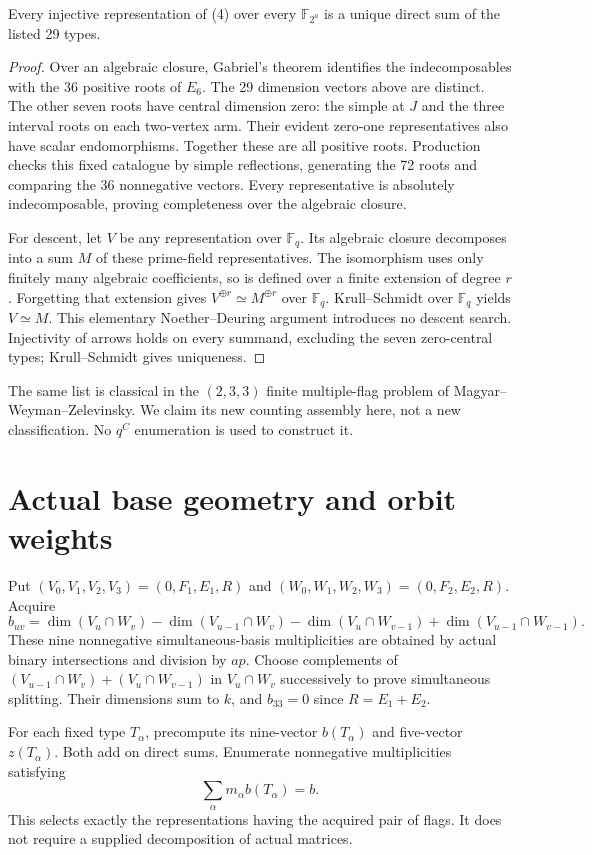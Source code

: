 \documentclass[11pt]{article}
\newcommand{\F}{\mathbb F}\newcommand{\Hom}{\operatorname{Hom}}
\begin{document}
\begin{lemma}
Every injective representation of (4) over every $\F_{2^a}$ is a unique
direct sum of the listed 29 types.
\end{lemma}
\begin{proof}
Over an algebraic closure, Gabriel's theorem identifies the
indecomposables with the 36 positive roots of $E_6$. The 29 dimension
vectors above are distinct. The other seven roots have central dimension
zero: the simple at $J$ and the three interval roots on each two-vertex
arm. Their evident zero-one representatives also have scalar
endomorphisms. Together these are all positive roots. Production checks
this fixed catalogue by simple reflections, generating the 72 roots and
comparing the 36 nonnegative vectors. Every representative is absolutely
indecomposable, proving completeness over the algebraic closure.

For descent, let $V$ be any representation over $\F_q$. Its algebraic
closure decomposes into a sum $M$ of these prime-field representatives.
The isomorphism uses only finitely many algebraic coefficients, so is
defined over a finite extension of degree $r$. Forgetting that extension
gives $V^{\oplus r}\simeq M^{\oplus r}$ over $\F_q$. Krull--Schmidt
over $\F_q$ yields $V\simeq M$. This elementary Noether--Deuring argument
introduces no descent search. Injectivity of arrows holds on every
summand, excluding the seven zero-central types; Krull--Schmidt gives
uniqueness.
\end{proof}
The same list is classical in the $(2,3,3)$ finite multiple-flag problem
of Magyar--Weyman--Zelevinsky. We claim its new counting assembly here,
not a new classification. No $q^C$ enumeration is used to construct it.

\section{Actual base geometry and orbit weights}
Put $(V_0,V_1,V_2,V_3)=(0,F_1,E_1,R)$ and
$(W_0,W_1,W_2,W_3)=(0,F_2,E_2,R)$. Acquire
\[
 b_{uv}=\dim(V_u\cap W_v)-\dim(V_{u-1}\cap W_v)
 -\dim(V_u\cap W_{v-1})+\dim(V_{u-1}\cap W_{v-1}).\tag{5}
\]
These nine nonnegative simultaneous-basis multiplicities are obtained by
actual binary intersections and division by $ap$. Choose complements of
$(V_{u-1}\cap W_v)+(V_u\cap W_{v-1})$ in $V_u\cap W_v$ successively
to prove simultaneous splitting. Their dimensions sum to $k$, and
$b_{33}=0$ since $R=E_1+E_2$.

For each fixed type $T_\alpha$, precompute its nine-vector $b(T_\alpha)$
and five-vector $z(T_\alpha)$. Both add on direct sums. Enumerate
nonnegative multiplicities satisfying
\[
 \sum_\alpha m_\alpha b(T_\alpha)=b.\tag{6}
\]
This selects exactly the representations having the acquired pair of
flags. It does not require a supplied decomposition of actual matrices.
\end{document}
